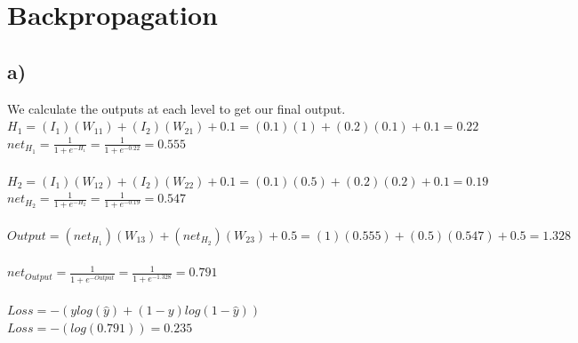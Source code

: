 \documentclass[12pt, letterpaper]{article}
\begin{document}
\newpage
\section{Backpropagation}
\subsection*{a)} We calculate the outputs at each level to get our final output.\\
$H_1 = (I_1)(W_{11}) + (I_2)(W_{21}) + 0.1 = (0.1)(1) + (0.2)(0.1) + 0.1 = 0.22$\\
$net_{H_1} = \frac{1}{1+e^{-H_1}} = \frac{1}{1+e^{-0.22}} = 0.555$\\\\
$H_2 = (I_1)(W_{12}) + (I_2)(W_{22}) + 0.1 = (0.1)(0.5) + (0.2)(0.2) + 0.1 = 0.19$\\
$net_{H_2} = \frac{1}{1+e^{-H_2}} = \frac{1}{1+e^{-0.19}} = 0.547$\\\\
$Output = (net_{H_1})(W_{13}) + (net_{H_2})(W_{23}) + 0.5 = (1)(0.555) + (0.5)(0.547) + 0.5 = 1.328$\\\\
$net_{Output} = \frac{1}{1+e^{-Output}} = \frac{1}{1+e^{-1.328}} = 0.791$\\\\
$Loss = -(ylog(\hat{y}) + (1-y)log(1-\hat{y}))$\\
$Loss = -(log(0.791)) = 0.235$\\
\end{document}
